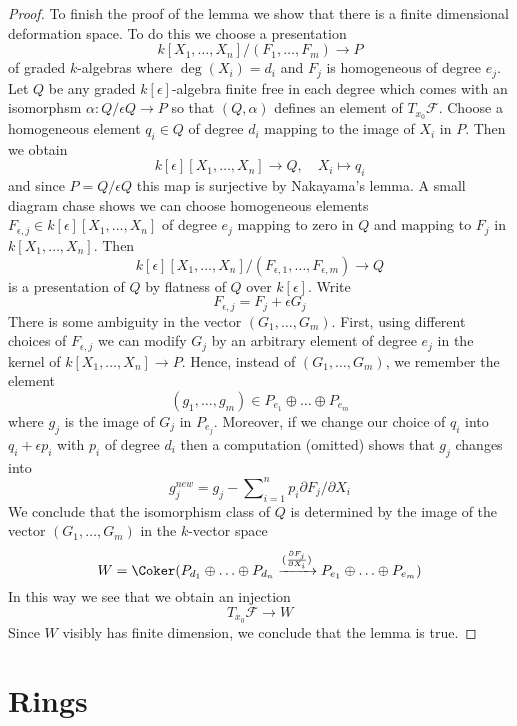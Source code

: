 \begin{proof}
\medskip\noindent
To finish the proof of the lemma we show that there is a finite
dimensional deformation space. To do this we
choose a presentation
$$
k[X_1, \ldots, X_n]/(F_1, \ldots, F_m) \longrightarrow P
$$
of graded $k$-algebras where $\deg(X_i) = d_i$ and
$F_j$ is homogeneous of degree $e_j$.
Let $Q$ be any graded $k[\epsilon]$-algebra
finite free in each degree which comes with an isomorphsm
$\alpha : Q/\epsilon Q \to P$ so that $(Q, \alpha)$ defines
an element of $T_{x_0}\mathcal{F}$.
Choose a homogeneous element $q_i \in Q$ of degree $d_i$
mapping to the image of $X_i$ in $P$.
Then we obtain
$$
k[\epsilon][X_1, \ldots, X_n] \longrightarrow Q,\quad
X_i \longmapsto q_i
$$
and since $P = Q/\epsilon Q$ this map is surjective by Nakayama's lemma.
A small diagram chase shows we can choose homogeneous elements
$F_{\epsilon, j} \in k[\epsilon][X_1, \ldots, X_n]$ of degree $e_j$
mapping to zero in $Q$ and mapping to $F_j$ in $k[X_1, \ldots, X_n]$.
Then
$$
k[\epsilon][X_1, \ldots, X_n]/(F_{\epsilon, 1}, \ldots, F_{\epsilon, m})
\longrightarrow Q
$$
is a presentation of $Q$ by flatness of $Q$ over $k[\epsilon]$.
Write
$$
F_{\epsilon, j} =  F_j + \epsilon G_j
$$
There is some ambiguity in the vector $(G_1, \ldots, G_m)$.
First, using different choices of $F_{\epsilon, j}$
we can modify $G_j$ by an arbitrary element of degree $e_j$
in the kernel of $k[X_1, \ldots, X_n] \to P$.
Hence, instead of $(G_1, \ldots, G_m)$, we remember the
element
$$
(g_1, \ldots, g_m) \in P_{e_1} \oplus \ldots \oplus P_{e_m}
$$
where $g_j$ is the image of $G_j$ in $P_{e_j}$.
Moreover, if we change our choice of $q_i$ into $q_i + \epsilon p_i$
with $p_i$ of degree $d_i$ then a computation (omitted) shows
that $g_j$ changes into
$$
g_j^{new} = g_j - \sum\nolimits_{i = 1}^n p_i \partial F_j / \partial X_i
$$
We conclude that the isomorphism class of $Q$ is determined by the
image of the vector $(G_1, \ldots, G_m)$ in the $k$-vector space
$$
W  = \Coker(P_{d_1} \oplus \ldots \oplus P_{d_n}
\xrightarrow{(\frac{\partial F_j}{\partial X_i})}
P_{e_1} \oplus \ldots \oplus P_{e_m})
$$
In this way we see that we obtain an injection
$$
T_{x_0}\mathcal{F} \longrightarrow W
$$
Since $W$ visibly has finite dimension, we conclude that the lemma is true.
\end{proof}





\section{Rings}
\label{section-rings}

